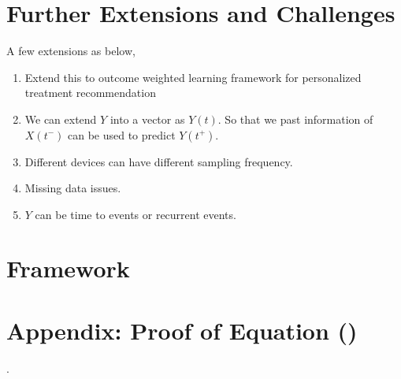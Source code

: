 \documentclass[12pt]{article}
\begin{document}
\section{Further Extensions and Challenges}
A few extensions as below,
\begin{enumerate}
	\item Extend this to outcome weighted learning framework for personalized treatment recommendation
	\item We can extend $Y$ into a vector as $Y(t)$. So that we past information of $X(t^-)$ can be used to predict $Y(t^+)$.
	\item Different devices can have different sampling frequency. 
	\item Missing data issues. 
	\item $Y$ can be time to events or recurrent events.
\end{enumerate}
\section{Framework}



\section*{Appendix: Proof of Equation ()}.






\end{document}
